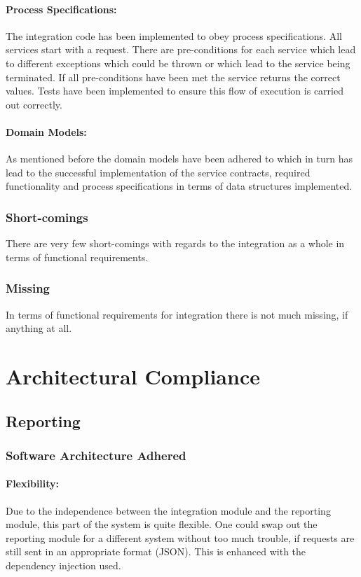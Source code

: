 \documentclass{article}
\begin{document}
			\paragraph{Process Specifications:}
			The integration code has been implemented to obey process specifications. 
			All services start with a request. There are pre-conditions for each service which lead to different exceptions which could be thrown or which lead to the service being terminated.
			If all pre-conditions have been met the service returns the correct values. Tests have been implemented to ensure this flow of execution is carried out correctly.
			\paragraph{Domain Models:}
			As mentioned before the domain models have been adhered to which in turn has lead to the successful implementation of the service contracts, required functionality and process specifications in terms of data structures implemented.
		\subsubsection{Short-comings}
			There are very few short-comings with regards to the integration as a whole in terms of functional requirements.
		\subsubsection{Missing}
			In terms of functional requirements for integration there is not much missing, if anything at all.
			
\cleardoublepage			
			
\section{Architectural Compliance}
    \subsection{Reporting}
        \subsubsection{Software Architecture Adhered}
            \paragraph{Flexibility:}
            Due to the independence between the integration module and the reporting module, this part of the system is quite flexible. One could swap out the reporting module for a different system without too much trouble, if requests are still sent in an appropriate format (JSON). This is enhanced with the dependency injection used.   
\end{document}
